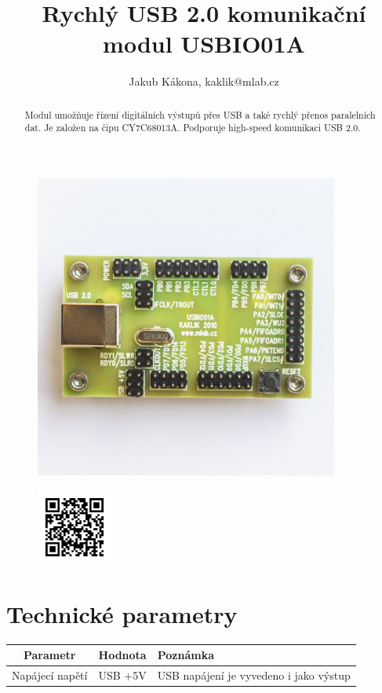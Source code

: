 \documentclass[12pt,a4paper,oneside]{article}
\begin{document}
\title{Rychlý USB 2.0 komunikační modul USBIO01A}
\author{Jakub Kákona, kaklik@mlab.cz}
\maketitle

\thispagestyle{empty}
\begin{abstract}
Modul umožňuje řízení digitálních výstupů přes USB a také rychlý přenos paralelních dat. Je založen na čipu CY7C68013A. Podporuje high-speed komunikaci USB 2.0.
\end{abstract}

\begin{figure} [htbp]
\begin{center}
\includegraphics [width=100mm] {./img/USBIO01A_Top_Big.jpg} 
\end{center}
\end{figure}

\begin{figure} [b]
\includegraphics [width=25mm] {./img/USBIO01A_QRcode.png} 
\end{figure}

\newpage
\tableofcontents

\section{Technické parametry}
\begin{table}[htbp]
\begin{center}
\begin{tabular}{|c|c|p{4.7cm}|}
\hline
Parametr & Hodnota & Poznámka \\
\hline
Napájecí napětí & USB +5V &  USB napájení je vyvedeno i jako výstup \\ 
\hline
\end{tabular}
\end{center}
\end{table}
\end{document}
